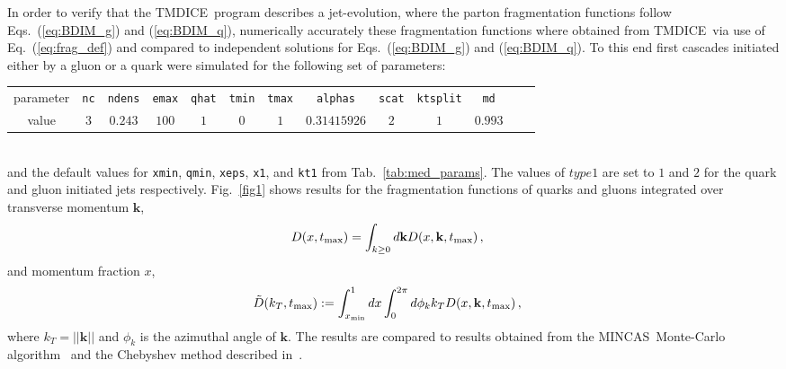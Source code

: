 \documentclass[preprint,12pt]{elsarticle}
\newcommand{\tmdice}{{\sf TMDICE}}
\newcommand{\mincas}{{\sf MINCAS}}
\begin{document}
In order to verify that the \tmdice~program describes a jet-evolution, where the parton fragmentation functions follow Eqs.~(\ref{eq:BDIM_g}) and (\ref{eq:BDIM_q}), numerically accurately these fragmentation functions where obtained from \tmdice~via use of Eq.~(\ref{eq:frag_def}) and compared to independent solutions for Eqs.~(\ref{eq:BDIM_g}) and (\ref{eq:BDIM_q}).
To this end first cascades initiated either by a gluon or a quark were simulated for the following set of parameters:

%
\begin{tabular}{c|c|c|c|c|c|c|c|c|c|c|c|c}
   parameter  &\verb#nc#&\verb#ndens#&\verb#emax#&\verb#qhat#&\verb#tmin#&\verb#tmax#&\verb#alphas#&\verb#scat#&\verb#ktsplit#&\verb#md#\\
    value & $3$&$0.243$&$100$&$1$&$0$&$1$&$0.31415926$&$2$&$1$&$0.993$
\end{tabular}
%
\\
and the default values for \verb#xmin#, \verb#qmin#, \verb#xeps#, \verb#x1#, and \verb#kt1# from Tab.~\ref{tab:med_params}. The values of $type1$ are set to $1$ and $2$ for the quark and gluon initiated jets respectively. 
Fig.~\ref{fig1} shows results for the fragmentation functions of quarks and gluons integrated over transverse momentum $\mathbf{k}$, 
\begin{align}
   D(x,t_{\rm max})&=\int_{k\geq 0} d\mathbf{k}D(x,\mathbf{k},t_{\rm max})\,, 
\end{align}
and momentum fraction $x$, 
\begin{align}
   \tilde{D}(k_T,t_{\rm max})&:=\int_{x_{\rm min}}^1 dx  \int_0^{2\pi} d\phi_k k_T D(x,\mathbf{k},t_{\rm max})\,, 
\end{align}
where $k_T=||\mathbf{k}||$ and $\phi_k$ is the azimuthal angle of $\mathbf{k}$.
The results are compared to results obtained from the \mincas~Monte-Carlo algorithm~\cite{Blanco:2021usa,Kutak:2018dim} and the Chebyshev method described in~\cite{Blanco:2021usa}. 
\end{document}
